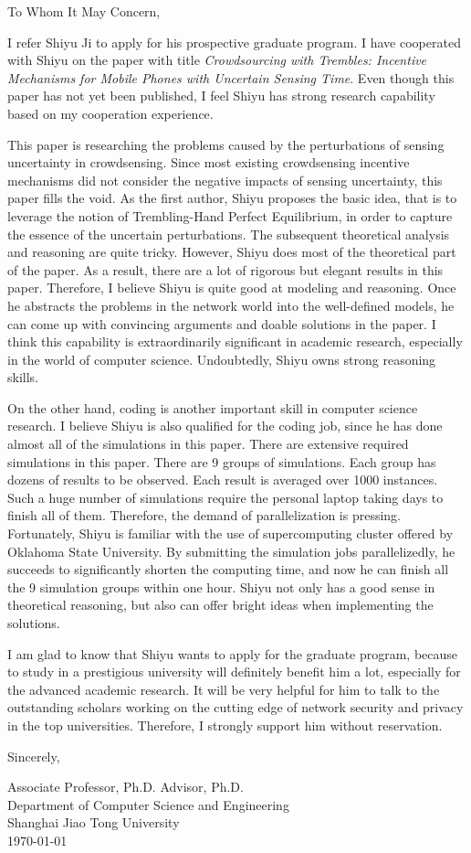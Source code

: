 \documentclass{letter}
\begin{document}
To Whom It May Concern,

I refer Shiyu Ji to apply for his prospective graduate program. I have cooperated with Shiyu on the paper with title \emph{Crowdsourcing with Trembles: Incentive Mechanisms for Mobile Phones with Uncertain Sensing Time}. Even though this paper has not yet been published, I feel Shiyu has strong research capability based on my cooperation experience.

This paper is researching the problems caused by the perturbations of sensing uncertainty in crowdsensing. Since most existing crowdsensing incentive mechanisms did not consider the negative impacts of sensing uncertainty, this paper fills the void. As the first author, Shiyu proposes the basic idea, that is to leverage the notion of Trembling-Hand Perfect Equilibrium, in order to capture the essence of the uncertain perturbations. The subsequent theoretical analysis and reasoning are quite tricky. However, Shiyu does most of the theoretical part of the paper. As a result, there are a lot of rigorous but elegant results in this paper. Therefore, I believe Shiyu is quite good at modeling and reasoning. Once he abstracts the problems in the network world into the well-defined models, he can come up with convincing arguments and doable solutions in the paper. I think this capability is extraordinarily significant in academic research, especially in the world of computer science. Undoubtedly, Shiyu owns strong reasoning skills.

On the other hand, coding is another important skill in computer science research. I believe Shiyu is also qualified for the coding job, since he has done almost all of the simulations in this paper. There are extensive required simulations in this paper. There are 9 groups of simulations. Each group has dozens of results to be observed. Each result is averaged over 1000 instances. Such a huge number of simulations require the personal laptop taking days to finish all of them. Therefore, the demand of parallelization is pressing. Fortunately, Shiyu is familiar with the use of supercomputing cluster offered by Oklahoma State University. By submitting the simulation jobs parallelizedly, he succeeds to significantly shorten the computing time, and now he can finish all the 9 simulation groups within one hour. Shiyu not only has a good sense in theoretical reasoning, but also can offer bright ideas when implementing the solutions.

I am glad to know that Shiyu wants to apply for the graduate program, because to study in a prestigious university will definitely benefit him a lot, especially for the advanced academic research. It will be very helpful for him to talk to the outstanding scholars working on the cutting edge of network security and privacy in the top universities. Therefore, I strongly support him without reservation.

Sincerely,

\vspace{1cm}

Associate Professor, Ph.D. Advisor, Ph.D.\\
Department of Computer Science and Engineering\\
Shanghai Jiao Tong University\\
\today{}
\end{document}
